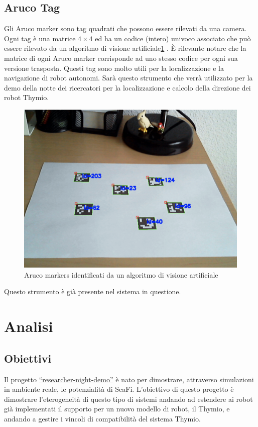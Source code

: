 \documentclass[12pt,a4paper,openright,twoside]{book}
\begin{document}
\section{Aruco Tag}

Gli Aruco marker sono tag quadrati che possono essere rilevati da una camera. Ogni tag è una matrice $4 \times 4$ ed ha un codice (intero) univoco associato che può essere rilevato da un algoritmo di visione artificiale\cref{fig:aruco-markers} \cite{opencvOpenCVDetection}. È rilevante notare che la matrice di ogni Aruco marker corrisponde ad uno stesso codice per ogni sua versione trasposta. 
Questi tag sono molto utili per la localizzazione e la navigazione di robot autonomi. Sarà questo strumento che verrà utilizzato per la demo della notte dei ricercatori per la localizzazione e calcolo della direzione dei robot Thymio.

\begin{figure}
    \centering
    \includegraphics[width=.8\linewidth]{figures/aruco-markers.png}
    \caption{Aruco markers identificati da un algoritmo di visione artificiale}
    \label{fig:aruco-markers}
\end{figure}

Questo strumento è già presente nel sistema in questione.

\chapter{Analisi}
\label{chap:analisi}

\section{Obiettivi}
Il progetto \href{https://github.com/cric96/researcher-night-demo.git}{``researcher-night-demo''} è nato per dimostrare, attraverso simulazioni in ambiente reale, le potenzialità di ScaFi. L'obiettivo di questo progetto è dimostrare l'eterogeneità di questo tipo di sistemi andando ad estendere ai robot già implementati il supporto per un nuovo modello di robot, il Thymio, e andando a gestire i vincoli di compatibilità del sistema Thymio.
\end{document}
